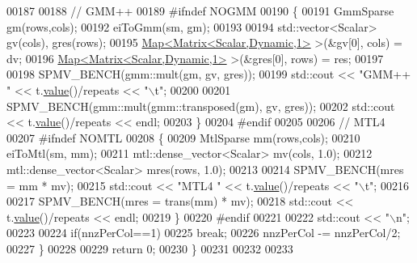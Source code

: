 \begin{DoxyCode}
00187 
00188     \textcolor{comment}{// GMM++}
00189 \textcolor{preprocessor}{    #ifndef NOGMM}
00190     \{
00191       GmmSparse gm(rows,cols);
00192       eiToGmm(sm, gm);
00193 
00194       std::vector<Scalar> gv(cols), gres(rows);
00195       \hyperlink{group___core___module_class_eigen_1_1_map}{Map<Matrix<Scalar,Dynamic,1>} >(&gv[0], cols) = dv;
00196       \hyperlink{group___core___module_class_eigen_1_1_map}{Map<Matrix<Scalar,Dynamic,1>} >(&gres[0], rows) = res;
00197 
00198       SPMV\_BENCH(gmm::mult(gm, gv, gres));
00199       std::cout << \textcolor{stringliteral}{"GMM++       "} << t.\hyperlink{class_eigen_1_1_bench_timer_a26760f963ed8b64c126159bfea57735e}{value}()/repeats << \textcolor{stringliteral}{"\(\backslash\)t"};
00200 
00201       SPMV\_BENCH(gmm::mult(gmm::transposed(gm), gv, gres));
00202       std::cout << t.\hyperlink{class_eigen_1_1_bench_timer_a26760f963ed8b64c126159bfea57735e}{value}()/repeats << endl;
00203     \}
00204 \textcolor{preprocessor}{    #endif}
00205 
00206     \textcolor{comment}{// MTL4}
00207 \textcolor{preprocessor}{    #ifndef NOMTL}
00208     \{
00209       MtlSparse mm(rows,cols);
00210       eiToMtl(sm, mm);
00211       mtl::dense\_vector<Scalar> mv(cols, 1.0);
00212       mtl::dense\_vector<Scalar> mres(rows, 1.0);
00213 
00214       SPMV\_BENCH(mres = mm * mv);
00215       std::cout << \textcolor{stringliteral}{"MTL4        "} << t.\hyperlink{class_eigen_1_1_bench_timer_a26760f963ed8b64c126159bfea57735e}{value}()/repeats << \textcolor{stringliteral}{"\(\backslash\)t"};
00216 
00217       SPMV\_BENCH(mres = trans(mm) * mv);
00218       std::cout << t.\hyperlink{class_eigen_1_1_bench_timer_a26760f963ed8b64c126159bfea57735e}{value}()/repeats << endl;
00219     \}
00220 \textcolor{preprocessor}{    #endif}
00221 
00222     std::cout << \textcolor{stringliteral}{"\(\backslash\)n"};
00223 
00224     \textcolor{keywordflow}{if}(nnzPerCol==1)
00225       \textcolor{keywordflow}{break};
00226     nnzPerCol -= nnzPerCol/2;
00227   \}
00228 
00229   \textcolor{keywordflow}{return} 0;
00230 \}
00231 
00232 
00233 
\end{DoxyCode}
